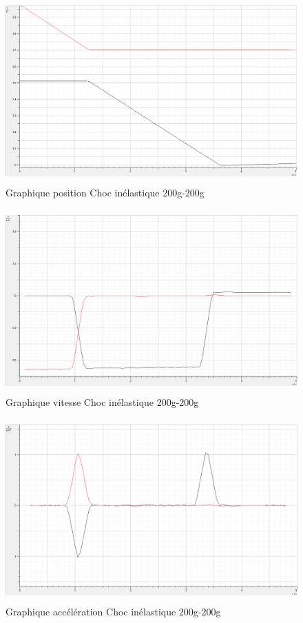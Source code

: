\newpage

\begin{figure}[h]
    \caption[Graphique position Choc élastique 200g-200g]{Graphique position Choc inélastique 200g-200g}
    \centering
    \includegraphics[height=19em]{Data/200-200ela01.png}
\end{figure}

\begin{figure}[h]
    \caption[Graphique vitesse Choc élastique 200g-200g]{Graphique vitesse Choc inélastique 200g-200g}
    \centering
    \includegraphics[height=19em]{Data/200-200ela02v.png}
\end{figure}

\newpage

\begin{figure}[h]
    \caption[Graphique accélération Choc élastique 200g-200g]{Graphique accélération Choc inélastique 200g-200g}
    \centering
    \includegraphics[height=19em]{Data/200-200ela02a.png}
\end{figure}

